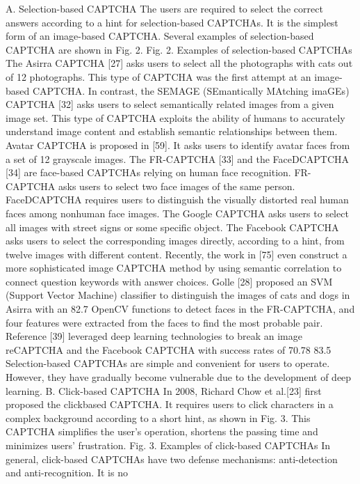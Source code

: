 A. Selection-based CAPTCHA
The users are required to select the correct answers
according to a hint for selection-based CAPTCHAs. It is the
simplest form of an image-based CAPTCHA. Several
examples of selection-based CAPTCHA are shown in Fig. 2.
Fig. 2. Examples of selection-based CAPTCHAs
The Asirra CAPTCHA [27] asks users to select all the
photographs with cats out of 12 photographs. This type of
CAPTCHA was the first attempt at an image-based
CAPTCHA. In contrast, the SEMAGE (SEmantically
MAtching imaGEs) CAPTCHA [32] asks users to select
semantically related images from a given image set. This type
of CAPTCHA exploits the ability of humans to accurately
understand image content and establish semantic relationships
between them. Avatar CAPTCHA is proposed in [59]. It asks
users to identify avatar faces from a set of 12 grayscale
images. The FR-CAPTCHA [33] and the FaceDCAPTCHA
[34] are face-based CAPTCHAs relying on human face
recognition. FR-CAPTCHA asks users to select two face
images of the same person. FaceDCAPTCHA requires users
to distinguish the visually distorted real human faces among
nonhuman face images. The Google CAPTCHA asks users to
select all images with street signs or some specific object. The
Facebook CAPTCHA asks users to select the corresponding
images directly, according to a hint, from twelve images with
different content. Recently, the work in [75] even construct a
more sophisticated image CAPTCHA method by using
semantic correlation to connect question keywords with
answer choices.
Golle [28] proposed an SVM (Support Vector Machine)
classifier to distinguish the images of cats and dogs in Asirra
with an 82.7%
OpenCV functions to detect faces in the FR-CAPTCHA, and
four features were extracted from the faces to find the most
probable pair. Reference [39] leveraged deep learning
technologies to break an image reCAPTCHA and the
Facebook CAPTCHA with success rates of 70.78%
83.5%
Selection-based CAPTCHAs are simple and convenient
for users to operate. However, they have gradually become
vulnerable due to the development of deep learning.
B. Click-based CAPTCHA
In 2008, Richard Chow et al.[23] first proposed the clickbased CAPTCHA. It requires users to click characters in a
complex background according to a short hint, as shown in
Fig. 3. This CAPTCHA simplifies the user's operation,
shortens the passing time and minimizes users’ frustration.
Fig. 3. Examples of click-based CAPTCHAs
In general, click-based CAPTCHAs have two defense
mechanisms: anti-detection and anti-recognition. It is no
